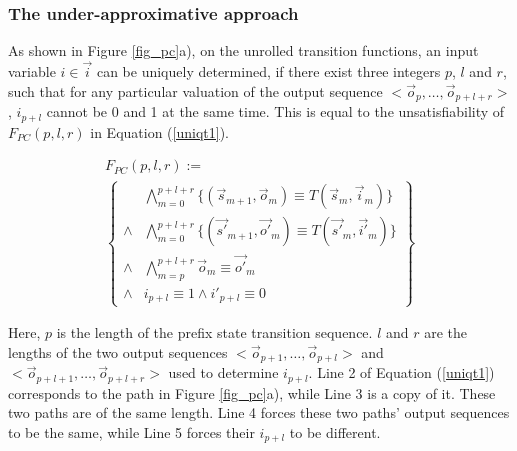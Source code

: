 \documentclass[twocolumn]{article}
\begin{document}
\subsubsection{The under-approximative approach}\label{subsub_sound}

As shown in Figure \ref{fig_pc}a),
on the unrolled transition functions,
an input variable $i\in\vec{i}$ can be uniquely determined,
if there exist three integers $p$, $l$ and $r$,
such that for any particular valuation of the output sequence $<\vec{o}_p,\dots,\vec{o}_{p+l+r}>$,
$i_{p+l}$ cannot be 0 and 1 at the same time.
This is equal to the unsatisfiability of $F_{PC}(p,l,r)$ in Equation (\ref{uniqt1}).

\begin{multline}\label{uniqt1}
F_{PC}(p,l,r):=\\
\left\{
\begin{array}{cc}
&\bigwedge_{m=0}^{p+l+r}
\{
(\vec{s}_{m+1},\vec{o}_m)\equiv T(\vec{s}_m,\vec{i}_m)
\}
\\
\wedge&\bigwedge_{m=0}^{p+l+r}
\{
(\vec{s'}_{m+1},\vec{o'}_m)\equiv T(\vec{s'}_m,\vec{i'}_m)
\}
\\
\wedge&\bigwedge_{m=p}^{p+l+r}\vec{o}_m\equiv \vec{o'}_m \\
\wedge& i_{p+l}\equiv 1 \wedge  i'_{p+l}\equiv 0 
\end{array}
\right\}
\end{multline}



Here,
$p$ is the length of the prefix state transition sequence.
$l$ and $r$ are the lengths of the two output sequences 
$<\vec{o}_{p+1},\dots,\vec{o}_{p+l}>$ and $<\vec{o}_{p+l+1},\dots,\vec{o}_{p+l+r}>$
used to determine $i_{p+l}$.
Line 2 of Equation (\ref{uniqt1}) corresponds to the path in Figure \ref{fig_pc}a),
while Line 3 is a copy of it.
These two paths are of the same length.
Line 4 forces these two paths' output sequences to be the same,
while Line 5 forces their $i_{p+l}$ to be different.
\end{document}
